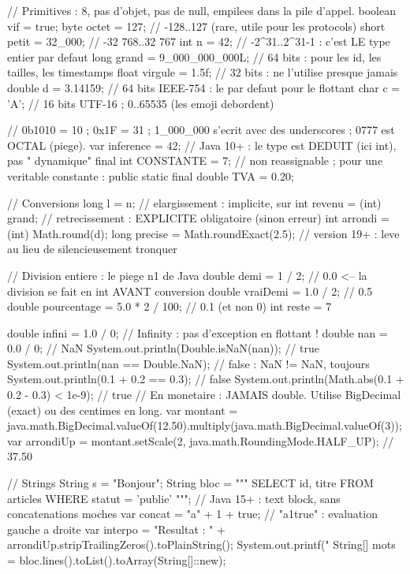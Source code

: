 \documentclass[12pt,a4paper,twoside,openright]{book}
\begin{document}
\begin{codejava}
// Primitives : 8, pas d'objet, pas de null, empilees dans la pile d'appel.
boolean vif = true;
byte octet = 127;                    // -128..127 (rare, utile pour les protocols)
short petit = 32_000;                // -32 768..32 767
int n = 42;                          // -2^31..2^31-1 : c'est LE type entier par defaut
long grand = 9_000_000_000L;         // 64 bits : pour les id, les tailles, les timestamps
float virgule = 1.5f;                // 32 bits : ne l'utilise presque jamais
double d = 3.14159;                  // 64 bits IEEE-754 : le par defaut pour le flottant
char c = 'A';                        // 16 bits UTF-16 ; 0..65535 (les emoji debordent)

// 0b1010 = 10 ; 0x1F = 31 ; 1_000_000 s'ecrit avec des underscores ; 0777 est OCTAL (piege).
var inference = 42;                  // Java 10+ : le type est DEDUIT (ici int), pas " dynamique"
final int CONSTANTE = 7;             // non reassignable ; pour une veritable constante :
public static final double TVA = 0.20;

// Conversions
long l = n;                          // elargissement : implicite, sur
int revenu = (int) grand;             // retrecissement : EXPLICITE obligatoire (sinon erreur)
int arrondi = (int) Math.round(d);
long precise = Math.roundExact(2.5); // version 19+ : leve au lieu de silencieusement tronquer

// Division entiere : le piege n1 de Java
double demi = 1 / 2;                 // 0.0  <-- la division se fait en int AVANT conversion
double vraiDemi = 1.0 / 2;           // 0.5
double pourcentage = 5.0 * 2 / 100;  // 0.1 (et non 0)
int reste = 7 %

double infini = 1.0 / 0;              // Infinity : pas d'exception en flottant !
double nan = 0.0 / 0;                 // NaN
System.out.println(Double.isNaN(nan));          // true
System.out.println(nan == Double.NaN);          // false : NaN != NaN, toujours
System.out.println(0.1 + 0.2 == 0.3);           // false
System.out.println(Math.abs(0.1 + 0.2 - 0.3) < 1e-9);  // true
// En monetaire : JAMAIS double. Utilise BigDecimal (exact) ou des centimes en long.
var montant = java.math.BigDecimal.valueOf(12.50).multiply(java.math.BigDecimal.valueOf(3));
var arrondiUp = montant.setScale(2, java.math.RoundingMode.HALF_UP);   // 37.50

// Strings
String s = "Bonjour";
String bloc = """
    SELECT id, titre
    FROM   articles
    WHERE  statut = 'publie'
    """;                               // Java 15+ : text block, sans concatenations moches
var concat = "a" + 1 + true;           // "a1true" : evaluation gauche a droite
var interpo = "Resultat : " + arrondiUp.stripTrailingZeros().toPlainString();
System.out.printf("%
String[] mots = bloc.lines().toList().toArray(String[]::new);
\end{codejava}
\end{document}
